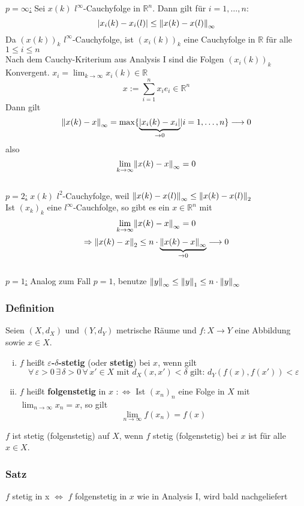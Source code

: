 \underline{$p=\infty$:} Sei $x(k)$ $l^{\infty}$-Cauchyfolge in $\mathbb{R}^n$. Dann gilt für $i=1,\dots,n$:
\[
	\abs{x_i(k)-x_i(l)} \leq \norm{x(k)-x(l)}_{\infty}
\]
Da $(x(k))_k$ $l^{\infty}$-Cauchyfolge, ist $(x_i(k))_k$ eine Cauchyfolge in $\mathbb{R}$ für alle $1\leq i \leq n$ \\
Nach dem Cauchy-Kriterium aus Analysis I sind die Folgen $(x_i(k))_k$ Konvergent. $x_i=\lim_{k \to \infty}x_i(k) \in \mathbb{R}$
\[
	x := \sum_{i=1}^{n}x_ie_i \in \mathbb{R}^n
\] 
Dann gilt 
\[
	\norm{x(k)-x}_{\infty} = \max\{ \underset{\to 0}{\underbrace{\abs{x_i(k)-x_i}}} | i=1,\dots,n \} \longrightarrow 0
\]
also
\[
	\lim_{k \to \infty}\norm{x(k)-x}_{\infty} = 0
\]
\\
\underline{$p=2$:}
$x(k)$ $l^2$-Cauchyfolge, weil $\norm{x(k)-x(l)}_{\infty} \leq \norm{x(k)-x(l)}_2$ \\
Ist $(x_k)_k$ eine $l^{\infty}$-Cauchfolge, so gibt es ein $x \in \mathbb{R}^n$ mit 
\[
	\lim_{k \to \infty}\norm{x(k)-x}_{\infty}=0
\]
\[
	\Rightarrow \norm{x(k)-x}_2 \leq n \cdot \underset{\to 0}{\underbrace{\norm{x(k)-x}_{\infty}}} \longrightarrow 0
\] 
\\
\underline{$p=1$:} Analog zum Fall $p=1$, benutze $\norm{y}_{\infty} \leq \norm{y}_1 \leq n \cdot \norm{y}_{\infty}$ 
\bewende	
\subsubsection{Definition} %
\label{ssub:definition}
Seien $(X,d_X)$ und $(Y,d_Y)$ metrische Räume und $f:X \to Y$ eine Abbildung sowie $x \in X$.
\begin{enumerate}[(i)]
	\item $f$ heißt {\bfseries $\varepsilon$-$\delta$-stetig} (oder {\bfseries stetig}) bei $x$, wenn gilt
	\[
		\forall\, \varepsilon >0 \, \exists \, \delta>0 \, \forall\, x' \in X \text{ mit } d_X(x,x')< \delta \text{ gilt: } d_Y(f(x),f(x'))<\varepsilon 
	\]
	\item $f$ heißt {\bfseries folgenstetig} in $x$ $:\Leftrightarrow$ Ist $(x_n)_n $ eine Folge in $X$ mit $\lim_{n \to \infty}x_n=x$, so gilt
	\[
		\lim_{n \to \infty}f(x_n)=f(x)
	\]
\end{enumerate}
$f$ ist stetig (folgenstetig) auf $X$, wenn $f$ stetig (folgenstetig) bei $x$ ist für alle $x \in X$.

\subsubsection{Satz} %
\label{ssub:satz}
$f$ stetig in x $\Leftrightarrow$ $f$ folgenstetig in $x$
 wie in Analysis I, wird bald nachgeliefert

